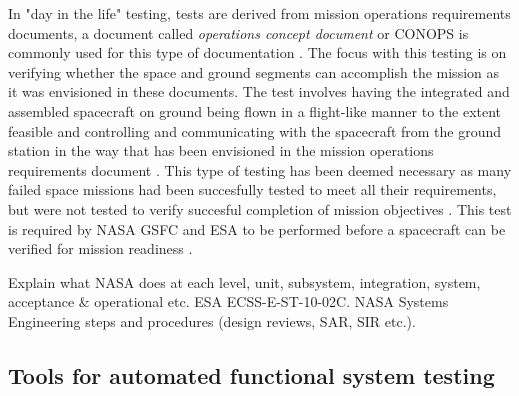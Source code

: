 \documentclass[english,12pt,a4paper,pdftex,elec,utf8]{aaltothesis}
\begin{document}
In "day in the life" testing, tests are derived from mission operations requirements documents, a document called \textit{operations concept document} or CONOPS is commonly used for this type of documentation \cite{tor}. The focus with this testing is on verifying whether the space and ground segments can accomplish the mission as it was envisioned in these documents. The test involves having the integrated and assembled spacecraft on ground being flown in a flight-like manner to the extent feasible and controlling and communicating with the spacecraft from the ground station in the way that has been envisioned in the mission operations requirements document \cite{tor}. This type of testing has been deemed necessary as many failed space missions had been succesfully tested to meet all their requirements, but were not tested to verify succesful completion of mission objectives \cite{tor}. This test is required by NASA GSFC and ESA to be performed before a spacecraft can be verified for mission readiness \cite{tor, ecss}. \par 
Explain what NASA does at each level, unit, subsystem, integration, system, acceptance \& operational etc.
ESA ECSS-E-ST-10-02C.
NASA Systems Engineering steps and procedures (design reviews, SAR, SIR etc.).\par
\subsection{Tools for automated functional system testing}
\end{document}
